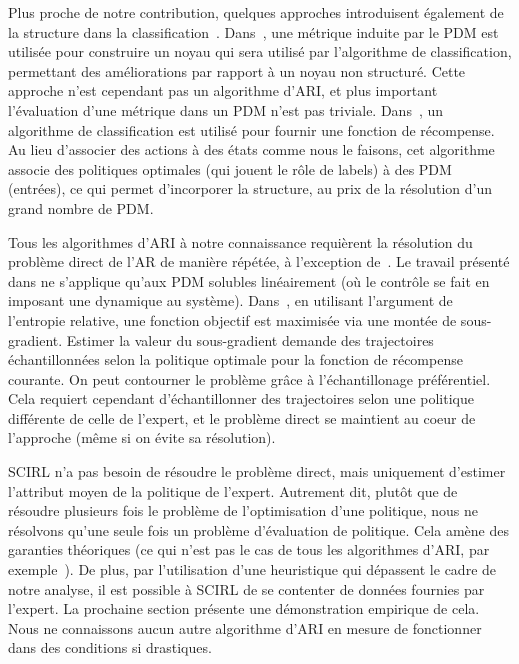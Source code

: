 \documentclass[english,utf8]{./hermes-journal}
\begin{document}
Plus proche de notre contribution, quelques approches introduisent également de la structure dans la classification~\cite{Melo:2010,Ratliff:2006}. Dans~\cite{Melo:2010},
une métrique induite par le PDM est utilisée pour construire un noyau qui sera utilisé par l'algorithme de classification, permettant des améliorations par rapport à un noyau non structuré. Cette approche n'est cependant pas un algorithme d'ARI, et plus important l'évaluation d'une métrique dans un PDM n'est pas triviale. Dans~\cite{Ratliff:2006}, un algorithme de classification est utilisé pour fournir une fonction de récompense. Au lieu d'associer des actions à des états comme nous le faisons, cet algorithme associe des politiques optimales (qui jouent le rôle de labels) à des PDM (entrées), ce qui permet d'incorporer la structure, au prix de la résolution d'un grand nombre de PDM.

Tous les algorithmes d'ARI à notre connaissance requièrent la résolution du problème direct de l'AR de manière répétée, à l'exception de~\cite{Dvij:2010,boularias:2011}.
Le travail présenté dans \cite{Dvij:2010} ne s'applique qu'aux PDM solubles linéairement (où le contrôle se fait en imposant une dynamique au système).
Dans~\cite{boularias:2011}, en utilisant l'argument de l'entropie relative, une fonction objectif est maximisée via une montée de sous-gradient. Estimer la valeur du sous-gradient demande des trajectoires échantillonnées selon la politique optimale pour la fonction de récompense courante. On peut contourner le problème grâce à l'échantillonage préférentiel. Cela requiert cependant d'échantillonner des trajectoires selon une politique différente de celle de l'expert, et le problème direct se maintient au coeur de l'approche (même si on évite sa résolution).

SCIRL n'a pas besoin de résoudre le problème direct, mais uniquement d'estimer l'attribut moyen de la politique de l'expert. Autrement dit, plutôt que de résoudre plusieurs fois le problème de l'optimisation d'une politique, nous ne résolvons qu'une seule fois un problème d'évaluation de politique. Cela amène des garanties théoriques (ce qui n'est pas le cas de tous les algorithmes d'ARI, par exemple~\cite{boularias:2011}). De plus, par l'utilisation d'une heuristique qui dépassent le cadre de notre analyse, il est possible à SCIRL de se contenter de données fournies par l'expert. La prochaine section présente une démonstration empirique de cela. Nous ne connaissons aucun autre algorithme d'ARI en mesure de fonctionner dans des conditions si drastiques.
\end{document}
